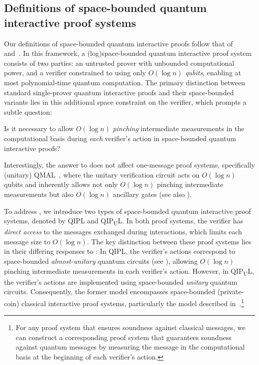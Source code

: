 \documentclass[10pt,a4paper]{article}
\numberwithin{equation}{section}
\numberwithin{figure}{section}
\newcommand{\QIPL}{\textnormal{\textsf{QIPL}}\xspace}
\newcommand{\QMAL}{\textnormal{\textsf{QMAL}}\xspace}
\newcommand{\QIPUL}{\texorpdfstring{\textnormal{\textsf{QIP}\textsubscript{\textnormal{U}}\textsf{L}}}\xspace}
\begin{document}
\subsection{Definitions of space-bounded quantum interactive proof systems}
\label{subsec:QIPL-definition}

Our definitions of space-bounded quantum interactive proofs follow that of~\cite[Section 2.3]{KW00} and~\cite[Section 2.3]{Wat02QSZK}. In this framework, a (log)space-bounded quantum interactive proof system consists of two parties: an untrusted prover with unbounded computational power, and a verifier constrained to using only \textit{$O(\log n)$ qubits}, enabling at most polynomial-time quantum computation. 
The primary distinction between standard single-prover quantum interactive proofs and their space-bounded variants lies in this additional space constraint on the verifier, which prompts a subtle question: 
\begin{problem}
    \label{prob:subtlety-in-intermediate-measurements}
    Is it necessary to allow $O(\log n)$ \emph{pinching} intermediate measurements in the computational basis during \emph{each} verifier's action in space-bounded quantum interactive proofs?
\end{problem}
Interestingly, the answer to  does not affect one-message proof systems, specifically (unitary) \QMAL{}~\cite{FKLMN16,FR21}, where the unitary verification circuit acts on $O(\log n)$ qubits and inherently allows not only $O(\log n)$ pinching intermediate measurements but also $O(\log n)$ ancillary gates (see also ). 

To address , we introduce two types of space-bounded quantum interactive proof systems, denoted by \QIPL{} and \QIPUL{}. 
In both proof systems, the verifier has \textit{direct access} to the messages exchanged during interactions, which limits each message size to $O(\log n)$. 
The key distinction between these proof systems lies in their differing responses to : In \QIPL{}, the verifier's actions correspond to space-bounded \textit{almost-unitary} quantum circuits (see ), allowing $O(\log{n})$ pinching intermediate measurements in each verifier's action. 
However, in \QIPUL{}, the verifier's actions are implemented using space-bounded \textit{unitary} quantum circuits. 
Consequently, the former model encompasses space-bounded (private-coin) classical interactive proof systems, particularly the model described in~\cite{CL95}.\footnote{For any proof system that ensures soundness against classical messages, we can construct a corresponding proof system that guarantees soundness against quantum messages by measuring the message in the computational basis at the beginning of each verifier's action.}
\end{document}

